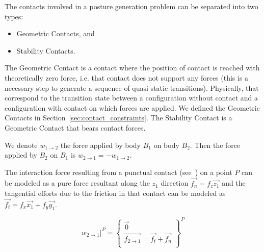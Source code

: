 
The contacts involved in a posture generation problem can be separated into two types:
\begin{itemize}
  \item Geometric Contacts, and
  \item Stability Contacts.
\end{itemize}
The Geometric Contact is a contact where the position of contact is reached with theoretically zero force, i.e. that contact does not support any forces (this is a necessary step to generate a sequence of quasi-static transitions).
Physically, that correspond to the transition state between a configuration without contact and a configuration with contact on which forces are applied.
We defined the Geometric Contacts in Section~\ref{sec:contact_constraints}.
The Stability Contact is a Geometric Contact that bears contact forces.


We denote $w_{1\rightarrow 2}$ the force applied by body $B_1$ on body $B_2$.
Then the force applied by $B_2$ on $B_1$ is $w_{2\rightarrow 1} = -w_{1\rightarrow 2}$.

The interaction force resulting from a punctual contact (see~) on a point $P$ can be modeled as a pure force resultant along the $z_1$ direction $\vec{f_n} = f_z \vec{z_1}$ and the tangential efforts due to the friction in that contact can be modeled as $\vec{f_t} = f_x \vec{x_1} + f_y \vec{y_1}$.

\begin{equation}
\label{eq:punctual_force}
\left. w_{2\rightarrow 1}\right|^P = \left\{
  \begin{array}{l}
    \vec{0} \\
    \overrightarrow{f_{2\rightarrow 1}} = \vec{f_t} + \vec{f_n} \\
  \end{array}
  \right\}^P
\end{equation}


